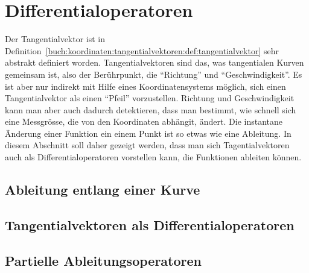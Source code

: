 %
%
%
\section{Differentialoperatoren
\label{buch:koordinaten:section:differentialoperatoren}}
Der Tangentialvektor ist in
Definition~\ref{buch:koordinaten:tangentialvektoren:def:tangentialvektor}
sehr abstrakt definiert worden.
Tangentialvektoren sind das, was tangentialen Kurven gemeinsam ist,
also der Berührpunkt, die ``Richtung'' und ``Geschwindigkeit''.
Es ist aber nur indirekt mit Hilfe eines Koordinatensystems möglich, sich 
einen Tangentialvektor als einen ``Pfeil'' vorzustellen.
Richtung und Geschwindigkeit kann man aber auch dadurch detektieren, dass
man bestimmt, wie schnell sich eine Messgrösse, die von den Koordinaten
abhängit, ändert.
Die instantane Änderung einer Funktion ein einem Punkt ist so etwas
wie eine Ableitung.
In diesem Abschnitt soll daher gezeigt werden, dass man sich
Tagentialvektoren auch als Differentialoperatoren vorstellen
kann, die Funktionen ableiten können.

%
%
\subsection{Ableitung entlang einer Kurve}

%
%
\subsection{Tangentialvektoren als Differentialoperatoren}

%
%
\subsection{Partielle Ableitungsoperatoren}

